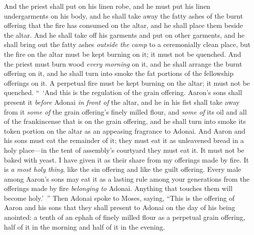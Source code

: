 \begin{biblechapter}
\verse And the priest shall put on his linen robe, and he must put his linen undergarments on his body, and he shall take away the fatty ashes of the burnt offering that the fire has consumed on the altar, and he shall place them beside the altar.
\verse And he shall take off his garments and put on other garments, and he shall bring out the fatty ashes \textit{outside the camp} to a ceremonially clean place,
\verse but the fire on the altar must be kept burning on it; it must not be quenched. And the priest must burn wood \textit{every morning} on it, and he shall arrange the burnt offering on it, and he shall turn into smoke the fat portions of the fellowship offerings on it.
\verse A perpetual fire must be kept burning on the altar; it must not be quenched.
 “ ‘And this is the regulation of the grain offering. Aaron’s sons shall present it \textit{before} Adonai \textit{in front of} the altar,
\verse and he in his fist shall take away from it \textit{some of} the grain offering’s finely milled flour, and \textit{some of} its oil and all of the frankincense that is on the grain offering, and he shall turn into smoke its token portion on the altar as an appeasing fragrance to Adonai.
\verse And Aaron and his sons must eat the remainder of it; they must eat it as unleavened bread in a holy place—in the tent of assembly’s courtyard they must eat it.
\verse It must not be baked with yeast. I have given it as their share from my offerings made by fire. It is \textit{a most holy thing}, like the sin offering and like the guilt offering.
\verse Every male among Aaron’s sons may eat it as a lasting rule among your generations from the offerings made by fire \textit{belonging to} Adonai. Anything that touches them will become holy.’ ”
\verse Then Adonai spoke to Moses, saying,
\verse “This is the offering of Aaron and his sons that they shall present to Adonai on the day of his being anointed: a tenth of an ephah of finely milled flour as a perpetual grain offering, half of it in the morning and half of it in the evening.

\end{biblechapter}
